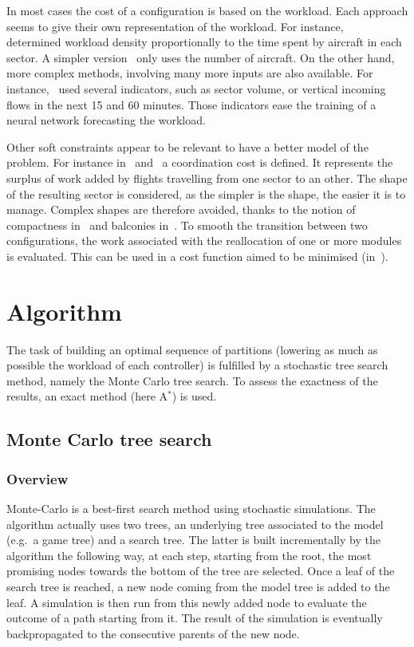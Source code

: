 \documentclass[twoside,twocolumn]{article}
\begin{document}
In most cases the cost of a configuration is based on the workload. Each
approach seems to give their own representation of the workload. For instance,
~\cite{bedouet2016towards} determined workload density proportionally to the time
spent by aircraft in each sector. A simpler version~\cite{sergeeva2017dynamic}
only uses the number of aircraft. On the other hand, more complex methods,
involving many more inputs are also available. For
instance,~\cite{gianazza2010forecasting} used several indicators, such as sector
volume, or vertical incoming flows in the next 15 and 60 minutes. Those
indicators ease the training of a neural network forecasting the workload.

Other soft constraints appear to be relevant to have a better model of
the problem. For instance in~\cite{sergeeva2017dynamic}
and~\cite{bedouet2016towards} a
coordination cost is defined. It represents the surplus of work added by
flights travelling from one sector to an other. The shape of the
resulting sector is considered, as the simpler is
the shape, the easier it is to manage. Complex shapes are therefore avoided,
thanks to the notion of compactness in~\cite{jagare2013airspace} and balconies
in~\cite{sergeeva2017dynamic}. To smooth the transition between two
configurations, the work associated with the reallocation of one or more modules
is evaluated. This can be used in a cost function aimed to be minimised
(in~\cite{bedouet2016towards}).

\section{Algorithm}

The task of building an optimal sequence of partitions (lowering
as much as possible the workload of each controller) is fulfilled by a
stochastic tree search method, namely the Monte Carlo tree search. To assess the
exactness of the results, an exact method (here A\(^*\)) is used.

\subsection{Monte Carlo tree search}
\subsubsection{Overview}
Monte-Carlo is a best-first search method using stochastic simulations. The
algorithm actually uses two trees, an underlying tree associated to the model
(e.g.\ a game tree) and a search tree. The latter is built incrementally by the
algorithm the following way, at each step, starting from the root, the most
promising nodes towards the bottom of the tree are selected. Once a leaf of the
search tree is reached, a new node coming from the model tree is added to the
leaf. A simulation is then run from this newly added node to evaluate the
outcome of a path starting from it. The result of the simulation is eventually
backpropagated to the consecutive parents of the new node.
\end{document}
